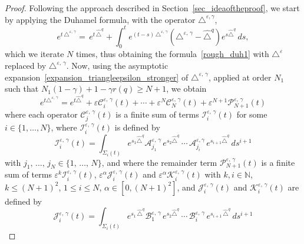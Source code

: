 \documentclass[10pt]{amsart}
\theoremstyle{definition}\newtheorem{defi}[theo]{Definition}\newtheorem{rema}[theo]{Remark}\newtheorem{exam}[theo]{Example}\newtheorem{exem}[theo]{Example}\newtheorem{nota}[theo]{Notation}
\newcommand*\N{\mathbb{N}}
\newcommand{\calK}{\mathcal{K}}
\newcommand{\calA}{\mathcal{A}}
\newcommand{\calC}{\mathcal{C}}
\newcommand{\calI}{\mathcal{I}}
\newcommand{\calP}{\mathcal{P}}
\newcommand{\calJ}{\mathcal{J}}
\newcommand{\calB}{\mathcal{B}}
\renewcommand{\geq}{\geqslant}
\renewcommand{\leq}{\leqslant}
\begin{document}
\begin{proof}
Following the approach described in Section~\ref{sec_ideaoftheproof}, we start by applying the Duhamel formula, with the operator $\triangle^{\varepsilon,\gamma}$,
\[
e^{t\,\triangle^{\varepsilon,\,\gamma}} =\, e^{t \,\widehat{\triangle}^{q}} + \int_0^t e^{(t-s)\,\triangle^{\varepsilon,\,\gamma}} \left(\triangle^{\varepsilon,\,\gamma} - \widehat{\triangle}^{q}\right) e^{s \widehat{\triangle}^{q}}\, ds,
\]
which we iterate $N$ times, thus obtaining the formula~\eqref{rough_duh1} with $\triangle^\varepsilon$ replaced by $\triangle^{\varepsilon,\,\gamma}$. Now, using the asymptotic expansion~\eqref{expansion_triangleepsilon_stronger} of $\triangle^{\varepsilon,\,\gamma}$, applied at order $N_1$ such that $N_1(1-\gamma)+1-\gamma r(q)\geq N+1$, we obtain
\begin{equation}\label{expansion_exp_triangle_epsgam}
e^{t\triangle^{\varepsilon,\,\gamma}} = e^{t \widehat{\triangle}^{q}} + \varepsilon \calC_i^{\varepsilon,\,\gamma}(t) + \cdots + \varepsilon^N \calC_N^{\varepsilon,\,\gamma}(t) + \varepsilon^{N+1} \calP_{N+1}^{\varepsilon,\,\gamma}(t)
\end{equation}
where each operator $\calC_j^{\varepsilon,\,\gamma}(t)$ is a finite sum of terms $\calI_i^{\varepsilon,\,\gamma}(t)$ for some $i\in\{1,\ldots,N\}$, where $\calI_i^{\varepsilon,\,\gamma}(t)$ is defined by
\begin{equation}\label{def_mathcal_Ii_epsgam}
\calI_i^{\varepsilon,\,\gamma}(t) = \int_{\Sigma_i(t)} e^{s_1 \widehat{\triangle}^{q}} \calA_{j_1}^{\varepsilon,\,\gamma} \, e^{s_2 \widehat{\triangle}^{q}}\,\cdots\,\calA_{j_i}^{\varepsilon,\gamma} \, e^{s_{i+1} \widehat{\triangle}^{q}} \, ds^{i+1}
\end{equation}
with $j_1,\,\ldots,\,j_N\in\{1,\,\ldots,\,N\}$, and where the remainder term $\calP_{N+1}^{\varepsilon,\,\gamma}(t)$ is a finite sum of terms $\varepsilon^k\calI_i^{\varepsilon,\,\gamma}(t)$, $\varepsilon^\alpha\calJ_i^{\varepsilon,\,\gamma}(t)$ and $\varepsilon^\alpha\calK_i^{\varepsilon,\,\gamma}(t)$ with $k,i\in\N$, $k\leq (N+1)^2$, $1\leq i\leq N$, $\alpha\in[0,(N+1)^2]$, and $\calJ_i^{\varepsilon,\,\gamma}(t)$ and $\calK_i^{\varepsilon,\,\gamma}(t)$ are defined by
\begin{equation}\label{def_mathcal_Jiepsgam}
\calJ_i^{\varepsilon,\,\gamma}(t) = \int_{\Sigma_i(t)} e^{s_1\, \widehat{\triangle}^{q}} \calB_{1}^{\varepsilon,\,\gamma} \, e^{s_2 \widehat{\triangle}^{q}}\,\cdots\,\calB_i^{\varepsilon,\,\gamma} \, e^{s_{i+1}\,\widehat{\triangle}^{q}} \, ds^{i+1}

\end{equation}
\end{proof}
\end{document}
